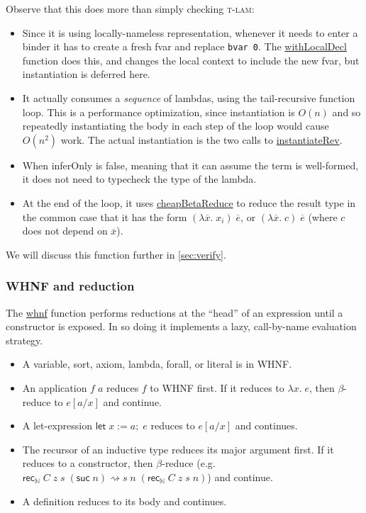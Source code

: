 \documentclass[sigplan,10pt,screen]{acmart}\settopmatter{printfolios=true,printccs=false,printacmref=false}
\newcommand{\N}{\mathbb{N}}
\newcommand{\code}[1]{\mbox{\ttfamily\small #1}}
\begin{document}
\noindent Observe that this does more than simply checking \textsc{t-lam}:
\begin{itemize}
  \item Since it is using locally-nameless representation, whenever it needs to enter a binder it has to create a fresh \code{fvar} and replace \lstinline|bvar 0|. The \href{https://github.com/digama0/lean4lean/blob/cpp2026/Lean4Lean/LocalContext.lean#L13}{\code{withLocalDecl}} function does this, and changes the local context to include the new \code{fvar}, but instantiation is deferred here.
  \item It actually consumes a \emph{sequence} of lambdas, using the tail-recursive function \code{loop}. This is a performance optimization, since instantiation is $O(n)$ and so repeatedly instantiating the body in each step of the loop would cause $O(n^2)$ work. The actual instantiation is the two calls to \href{https://github.com/leanprover/lean4/blob/v4.20.1/src/Lean/Expr.lean#L1400}{\code{instantiateRev}}.
  \item When \code{inferOnly} is false, meaning that it can assume the term is well-formed, it does not need to typecheck the type of the lambda.
  \item At the end of the loop, it uses \href{https://github.com/digama0/lean4lean/blob/cpp2026/Lean4Lean/Instantiate.lean#L8}{\code{cheapBetaReduce}} to reduce the result type in the common case that it has the form $(\lambda \overline{x}.\;x_i)\;\overline{e}$, or $(\lambda \overline{x}.\;c)\;\overline{e}$ (where $c$ does not depend on $\overline{x}$).
\end{itemize}
We will discuss this function further in \autoref{sec:verify}.

\subsubsection{WHNF and reduction}
The \href{https://github.com/digama0/lean4lean/blob/cpp2026/Lean4Lean/TypeChecker.lean#L435}{\code{whnf}} function performs reductions at the ``head'' of an expression until a constructor is exposed. In so doing it implements a lazy, call-by-name evaluation strategy.

\begin{itemize}
  \item A variable, sort, axiom, lambda, forall, or literal is in WHNF.
  \item An application $f\;a$ reduces $f$ to WHNF first. If it reduces to $\lambda x.\;e$, then $\beta$-reduce to $e[a/x]$ and continue.
  \item A let-expression $\mathsf{let}\;x:=a;\;e$ reduces to $e[a/x]$ and continues.
  \item The recursor of an inductive type reduces its major argument first. If it reduces to a constructor, then $\beta$-reduce (e.g. $\mathsf{rec}_\N\;C\;z\;s\;(\mathsf{suc}\;n)\rightsquigarrow s\;n\;(\mathsf{rec}_\N\;C\;z\;s\;n)$) and continue.
  \item A definition reduces to its body and continues.
\end{itemize}
\end{document}
